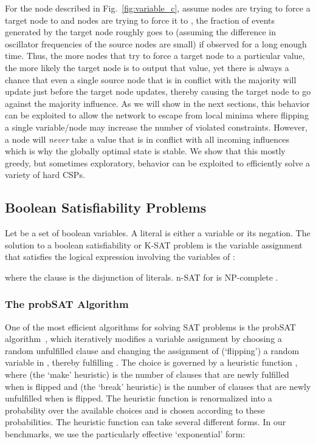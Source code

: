 \documentclass[10pt]{article}
\begin{document}
For the node described in Fig.~\ref{fig:variable_c}, assume  nodes are trying to force a target node to  and  nodes are trying to force it to , the fraction of  events generated by the target node roughly goes to  (assuming the difference in oscillator frequencies of the source nodes are small) if observed for a long enough time. Thus, the more nodes that try to force a target node to a particular value, the more likely the target node is to output that value, yet there is always a chance that even a single source node that is in conflict with the majority will update just before the target node updates, thereby causing the target node to go against the majority influence. As we will show in the next sections, this behavior can be exploited to allow the network to escape from local minima where flipping a single variable/node may increase the number of violated constraints. However, a node will {\it never} take a value that is in conflict with all incoming influences which is why the globally optimal state is stable. We show that this mostly greedy, but sometimes exploratory, behavior can be exploited to efficiently solve a variety of hard CSPs. 


\subsection*{Boolean Satisfiability Problems}
\label{sec:bool}
Let  be a set of boolean variables. A literal is either a variable or its negation. The solution to a boolean satisfiability or K-SAT problem is the variable assignment that satisfies the logical expression involving the variables of :

where the clause  is the disjunction of  literals. n-SAT for  is NP-complete \cite{Sipser96}. 










\subsubsection*{The probSAT Algorithm}
One of the most efficient algorithms for solving SAT problems is the probSAT algorithm~\cite{Balint_Schoning12}, which iteratively modifies a variable assignment by choosing a random unfulfilled clause  and changing the assignment of (`flipping') a random variable  in , thereby fulfilling . The choice  is governed by a heuristic function , where  (the `make' heuristic) is the number of clauses that are newly fulfilled when  is flipped and  (the `break' heuristic) is the number of clauses that are newly unfulfilled when  is flipped. The heuristic function is renormalized into a probability over the available choices and  is chosen according to these probabilities.
The heuristic function  can take several different forms. In our benchmarks, we use the particularly effective `exponential' form:
\end{document}

